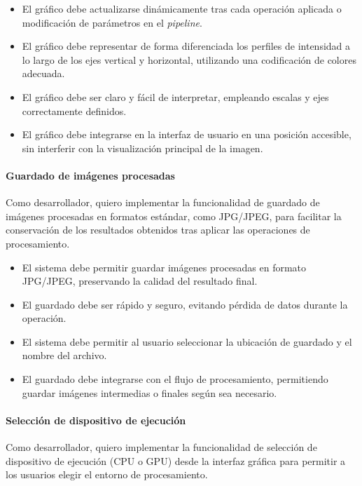 \begin{itemize}[noitemsep]
	\item El gráfico debe actualizarse dinámicamente tras cada operación aplicada o modificación de parámetros en
	el \textit{pipeline}.
	\item El gráfico debe representar de forma diferenciada los perfiles de intensidad a lo largo de los ejes vertical y horizontal, utilizando una codificación de colores adecuada.
	\item El gráfico debe ser claro y fácil de interpretar, empleando escalas y ejes correctamente definidos.
	\item El gráfico debe integrarse en la interfaz de usuario en una posición accesible, sin interferir con la visualización principal de la imagen.
\end{itemize}

\paragraph{Guardado de imágenes procesadas} \label{hist:guardado_imagenes_procesadas}
Como desarrollador, quiero implementar la funcionalidad de guardado de imágenes procesadas en formatos 
estándar, como JPG/JPEG, para facilitar la conservación de los resultados obtenidos tras aplicar las 
operaciones de procesamiento.

\begin{itemize}[noitemsep]
    \item El sistema debe permitir guardar imágenes procesadas en formato JPG/JPEG, preservando la calidad del resultado final.
    \item El guardado debe ser rápido y seguro, evitando pérdida de datos durante la operación.
    \item El sistema debe permitir al usuario seleccionar la ubicación de guardado y el nombre del archivo.
    \item El guardado debe integrarse con el flujo de procesamiento, permitiendo guardar imágenes intermedias o finales según sea necesario.
\end{itemize}

\paragraph{Selección de dispositivo de ejecución} \label{hist:seleccion_dispositivo_ejecucion}
Como desarrollador, quiero implementar la funcionalidad de selección de dispositivo de ejecución (CPU o GPU)
desde la interfaz gráfica para permitir a los usuarios elegir el entorno de procesamiento.

